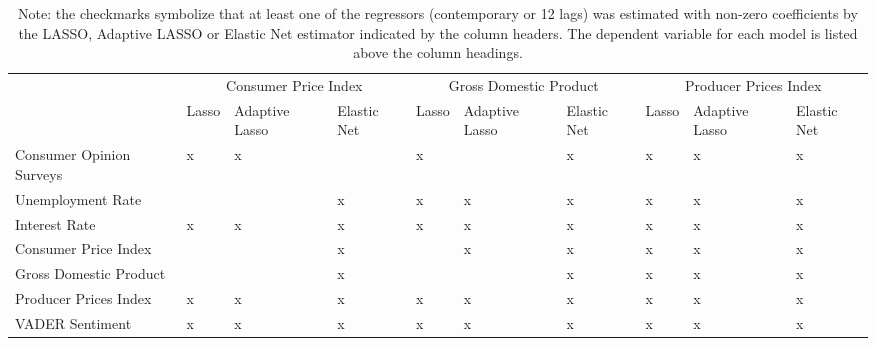 \begin{landscape}
\begin{table}[]
\begin{adjustbox}{max width=\linewidth}
\begin{tabular}{llllllllll}
                         & \multicolumn{3}{c}{Consumer Price Index}       & \multicolumn{3}{c}{Gross Domestic Product} & \multicolumn{3}{c}{Producer Prices Index} \\
                         & Lasso     & Adaptive Lasso    & Elastic Net    & Lasso    & Adaptive Lasso   & Elastic Net  & Lasso   & Adaptive Lasso   & Elastic Net  \\
Consumer Opinion Surveys & x         & x                 &                & x        &                  & x            & x       & x                & x            \\
Unemployment Rate        &           &                   & x              & x        & x                & x            & x       & x                & x            \\
Interest Rate            & x         & x                 & x              & x        & x                & x            & x       & x                & x            \\
Consumer Price Index     &           &                   & x              &          & x                & x            & x       & x                & x            \\
Gross Domestic Product   &           &                   & x              &          &                  & x            & x       & x                & x            \\
Producer Prices Index    & x         & x                 & x              & x        & x                & x            & x       & x                & x            \\ \hline
VADER Sentiment          & x         & x                 & x              & x        & x                & x            & x       & x                & x \\ \hline    
\end{tabular}
\end{adjustbox}
\caption*{Note: the checkmarks symbolize that at least one of the regressors (contemporary or 12 lags) was estimated with non-zero coefficients by the LASSO, Adaptive LASSO or Elastic Net estimator indicated by the column headers. The dependent variable for each model is listed above the column headings.}
\end{table}
\end{landscape}



